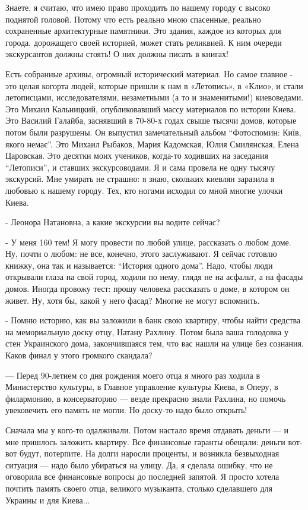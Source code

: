Знаете, я считаю, что имею право проходить по нашему городу с высоко поднятой
головой. Потому что есть реально мною спасенные, реально сохраненные
архитектурные памятники. Это здания, каждое из которых для города, дорожащего
своей историей, может стать реликвией. К ним очереди экскурсантов должны
стоять! О них должны писать в книгах! 

Есть собранные архивы, огромный исторический материал. Но самое главное - это
целая когорта людей, которые пришли к нам в «Летопись», в «Клио», и стали
летописцами, исследователями, незаметными (а то и знаменитыми!) киевоведами.
Это Михаил Кальницкий, опубликовавший массу материалов по истории Киева. Это
Василий Галайба, заснявший в 70-80-х годах свыше тысячи домов, которые потом
были разрушены. Он выпустил замечательный альбом “Фотоспомин: Київ, якого
немає”. Это Михаил Рыбаков, Мария Кадомская, Юлия Смилянская, Елена Царовская.
Это десятки моих учеников, когда-то ходивших на заседания “Летописи”, и ставших
экскурсоводами. Я и сама провела не одну тысячу экскурсий. Мне умирать не
страшно: я знаю, скольких киевлян заразила я любовью к нашему городу. Тех, кто
ногами исходил со мной многие улочки Киева. 

- Леонора Натановна, а какие экскурсии вы водите сейчас?

- У меня 160 тем! Я могу провести по любой улице, рассказать о любом доме. Ну,
почти о любом: не все, конечно, этого заслуживают. Я сейчас готовлю книжку, она
так и называется: \enquote{История одного дома}. Надо, чтобы люди открывали глаза на
свой город, ходили по нему, глядя не на асфальт, а на фасады домов. Иногда
провожу тест: прошу человека рассказать о доме, в котором он живет. Ну, хотя
бы, какой у него фасад? Многие не могут вспомнить. 

- Помню историю, как вы заложили в банк свою квартиру, чтобы найти средства на
мемориальную доску отцу, Натану Рахлину. Потом была ваша голодовка у стен
Украинского дома, закончившаяся тем, что вас нашли на улице без сознания. Каков
финал у этого громкого скандала? 

— Перед 90-летием со дня рождения моего отца я много раз ходила в Министерство
культуры, в Главное управление культуры Киева, в Оперу, в филармонию, в
консерваторию — везде прекрасно знали Рахлина, но помочь увековечить его память
не могли. Но доску-то надо было открыть! 

Сначала мы у кого-то одалживали. Потом настало время отдавать деньги — и мне
пришлось заложить квартиру. Все финансовые гаранты обещали: деньги вот-вот
будут, потерпите. На долги наросли проценты, и возникла безвыходная ситуация —
надо было убираться на улицу. Да, я сделала ошибку, что не оговорила все
финансовые вопросы до последней запятой. Я просто хотела почтить память своего
отца, великого музыканта, столько сделавшего для Украины и для Киева... 


